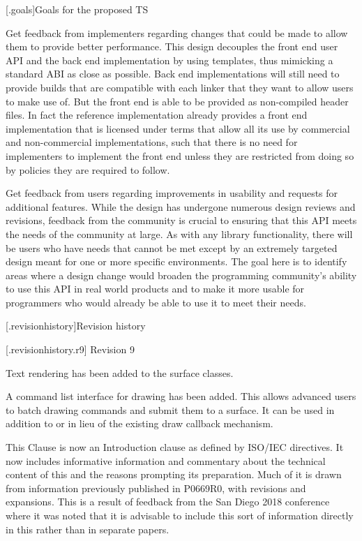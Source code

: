 [\iotwod.goals]{Goals for the proposed TS}

\pnum
Get feedback from implementers regarding changes that could be made to allow them to provide better performance. This design decouples the front end user API and the back end implementation by using templates, thus mimicking a standard ABI as close as possible. Back end implementations will still need to provide builds that are compatible with each linker that they want to allow users to make use of. But the front end is able to be provided as non-compiled header files. In fact the reference implementation already provides a front end implementation that is licensed under terms that allow all its use by commercial and non-commercial implementations, such that there is no need for implementers to implement the front end unless they are restricted from doing so by policies they are required to follow.

\pnum
Get feedback from users regarding improvements in usability and requests for additional features. While the design has undergone numerous design reviews and revisions, feedback from the \Cpp{} community is crucial to ensuring that this API meets the needs of the community at large. As with any library functionality, there will be users who have needs that cannot be met except by an extremely targeted design meant for one or more specific environments. The goal here is to identify areas where a design change would broaden the \Cpp{} programming community's ability to use this API in real world products and to make it more usable for \Cpp{} programmers who would already be able to use it to meet their needs.

[\iotwod.revisionhistory]{Revision history}

 [\iotwod.revisionhistory.r9] {Revision 9}

\pnum
Text rendering has been added to the surface classes.

\pnum
A command list interface for drawing has been added. This allows advanced users to batch drawing commands and submit them to a surface. It can be used in addition to or in lieu of the existing draw callback mechanism. 

\pnum
This Clause is now an Introduction clause as defined by ISO/IEC directives. It now includes informative information and commentary about the technical content of this \documenttypename{} and the reasons prompting its preparation. Much of it is drawn from information previously published in P0669R0, with revisions and expansions. This is a result of feedback from the San Diego 2018 conference where it was noted that it is advisable to include this sort of information directly in this \documenttypename{} rather than in separate papers.

